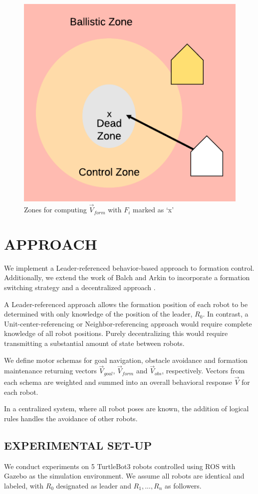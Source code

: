 \documentclass[letterpaper, 10 pt, conference]{ieeeconf}  %
\begin{document}
\begin{figure}[ht]
\centering
\includegraphics[width=0.45\linewidth]{images/formation_zones.png}
\caption{Zones for computing $\vec{V}_{form}$ with $F_i$ marked as `x'}
\label{formation_zones}
\end{figure}

\section{APPROACH}

We implement a Leader-referenced behavior-based approach to formation control. Additionally, we extend the work of Balch and Arkin to incorporate a formation switching strategy and a decentralized approach \cite{repository}.

A Leader-referenced approach allows the formation position of each robot to be determined with only knowledge of the position of the leader, $R_0$. In contrast, a Unit-center-referencing or Neighbor-referencing approach would require complete knowledge of all robot positions. Purely decentralizing this would require transmitting a substantial amount of state between robots.

We define motor schemas for goal navigation, obstacle avoidance and formation maintenance returning vectors $\vec{V}_{goal}$, $\vec{V}_{form}$ and $\vec{V}_{obs}$, respectively. Vectors from each schema are weighted and summed into an overall behavioral response $\vec{V}$ for each robot.

In a centralized system, where all robot poses are known, the addition of logical rules handles the avoidance of other robots.

\subsection{EXPERIMENTAL SET-UP}

We conduct experiments on 5 TurtleBot3 \cite{turtlebot} robots controlled using ROS \cite{ros} with Gazebo \cite{gazebo} as the simulation environment. We assume all robots are identical and labeled, with $R_0$ designated as leader and $R_1,...,R_n$ as followers. 
\end{document}
